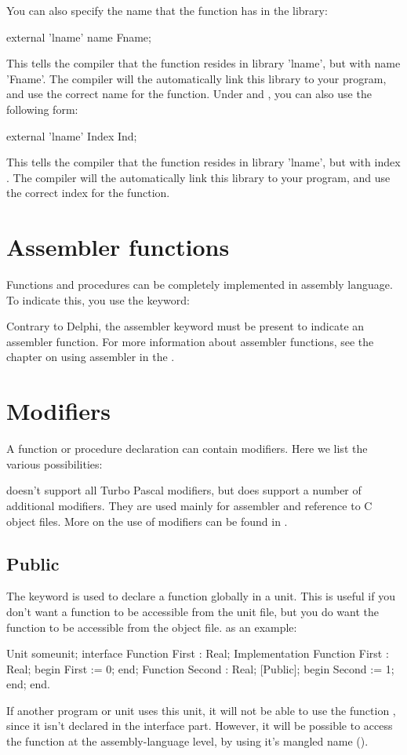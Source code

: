 \documentclass{report}
\begin{document}
You can also specify the name that the function has in the library:
\begin{listing}
external 'lname' name Fname;
\end{listing}
This tells the compiler that the function resides in library 'lname', 
but with name 'Fname'. The compiler will the automatically link this 
library to your program, and use the correct name for the function.
Under \windows and \ostwo, you can also use the following form:
\begin{listing}
external 'lname' Index Ind;
\end{listing}
This tells the compiler that the function resides in library 'lname', 
but with index . The compiler will the automatically 
link this library to your program, and use the correct index for the
function. 
\section{Assembler functions}
Functions and procedures can be completely implemented in assembly
language. To indicate this, you use the  keyword:

Contrary to Delphi, the assembler keyword must be present to indicate an
assembler function.
For more information about assembler functions, see the chapter on using
assembler in the \progref.
 
\section{Modifiers}
A function or procedure declaration can contain modifiers. Here we list the
various possibilities:

\fpc doesn't support all Turbo Pascal modifiers, but
does support a number of additional modifiers. They are used mainly for assembler and
reference to C object files. More on the use of modifiers can be found in
\progref.
\subsection{Public}
The  keyword is used to declare a function globally in a unit.
This is useful if you don't want a function to be accessible from the unit
file, but you do want the function to be accessible from the object file.
as an example:
\begin{listing}
Unit someunit;
interface
Function First : Real;
Implementation
Function First : Real;
begin
  First := 0;
end;
Function Second : Real; [Public];
begin
  Second := 1;
end;
end.
\end{listing}
If another program or unit uses this unit, it will not be able to use the
function , since it isn't declared in the interface part.
However, it will be possible to access the function  at the
assembly-language level, by using it's mangled name (\progref).
\end{document}
